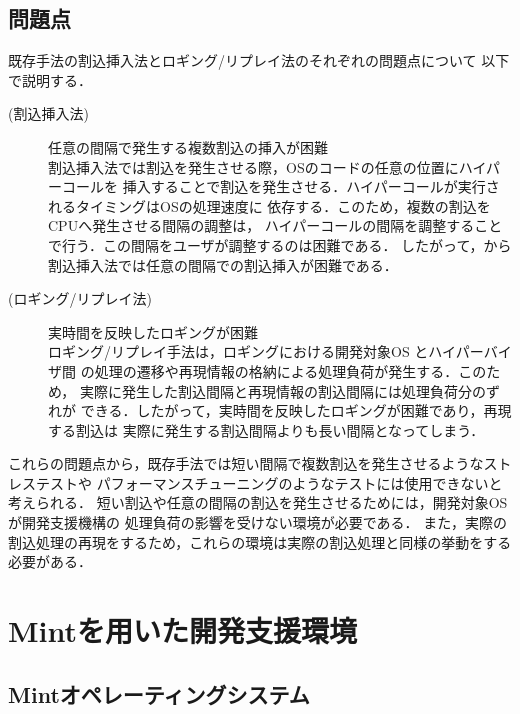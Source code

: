 \documentclass[submit,techreq,noauthor,dvipdfmx]{ipsj}
\begin{document}
\subsection{問題点}\label{sec:problem}

既存手法の割込挿入法とロギング/リプレイ法のそれぞれの問題点について
以下で説明する．

\begin{description}
    \item[(割込挿入法)]任意の間隔で発生する複数割込の挿入が困難\\
        割込挿入法では割込を発生させる際，OSのコードの任意の位置にハイパーコールを
        挿入することで割込を発生させる．ハイパーコールが実行されるタイミングはOSの処理速度に
        依存する．このため，複数の割込をCPUへ発生させる間隔の調整は，
        ハイパーコールの間隔を調整することで行う．この間隔をユーザが調整するのは困難である．
        したがって，から割込挿入法では任意の間隔での割込挿入が困難である．

    \item[(ロギング/リプレイ法)]実時間を反映したロギングが困難\\
        ロギング/リプレイ手法は，ロギングにおける開発対象OS とハイパーバイザ間
        の処理の遷移や再現情報の格納による処理負荷が発生する．このため，
        実際に発生した割込間隔と再現情報の割込間隔には処理負荷分のずれが
        できる．したがって，実時間を反映したロギングが困難であり，再現する割込は
        実際に発生する割込間隔よりも長い間隔となってしまう．
\end{description}

これらの問題点から，既存手法では短い間隔で複数割込を発生させるようなストレステストや
パフォーマンスチューニングのようなテストには使用できないと考えられる．
短い割込や任意の間隔の割込を発生させるためには，開発対象OSが開発支援機構の
処理負荷の影響を受けない環境が必要である．
また，実際の割込処理の再現をするため，これらの環境は実際の割込処理と同様の挙動をする
必要がある．

\section{Mintを用いた開発支援環境}\label{chap:Mint}

\subsection{Mintオペレーティングシステム}\label{sec:structure_of_Mint}
\end{document}

